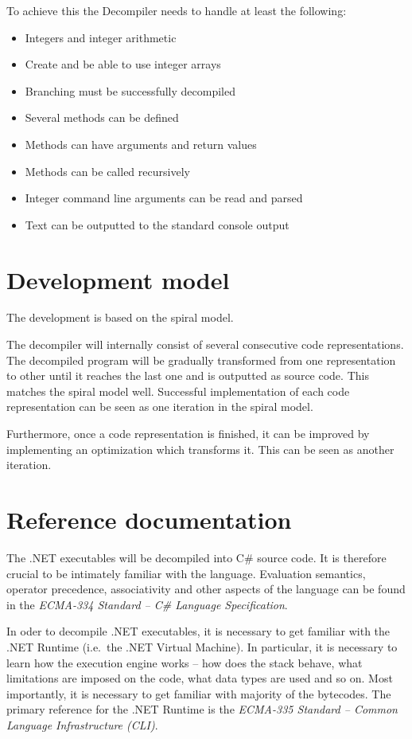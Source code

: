 \documentclass[12pt,twoside,notitlepage]{report}
\begin{document}
To achieve this the Decompiler needs to handle at least the following:
\begin{itemize}
	\item Integers and integer arithmetic
	\item Create and be able to use integer arrays
	\item Branching must be successfully decompiled
	\item Several methods can be defined
	\item Methods can have arguments and return values
	\item Methods can be called recursively
	\item Integer command line arguments can be read and parsed
	\item Text can be outputted to the standard console output
\end{itemize}


\section{Development model}

The development is based on the spiral model.

The decompiler will internally consist of several consecutive code
representations.  The decompiled program will be gradually
transformed from one representation to other until it reaches
the last one and is outputted as source code.
This matches the spiral model well.  Successful implementation
of each code representation can be seen as one iteration in the
spiral model.

Furthermore, once a code representation is finished, it can
be improved by implementing an optimization which transforms it.
This can be seen as another iteration.


\section{Reference documentation}

The .NET executables will be decompiled into C\# source code.
It is therefore crucial to be intimately familiar with the language.
Evaluation semantics, operator precedence, associativity and other
aspects of the language can be found in the \emph{ECMA-334 Standard --
C\# Language Specification}.

In oder to decompile .NET executables, it is necessary to get
familiar with the .NET Runtime (i.e.\ the .NET Virtual Machine).
In particular, it is necessary to learn how the execution engine
works -- how does the stack behave, what limitations are imposed
on the code, what data types are used and so on.
Most importantly, it is necessary to get familiar with majority
of the bytecodes.
The primary reference for the .NET Runtime is the
\emph{ECMA-335 Standard -- Common Language Infrastructure (CLI)}.
\end{document}
